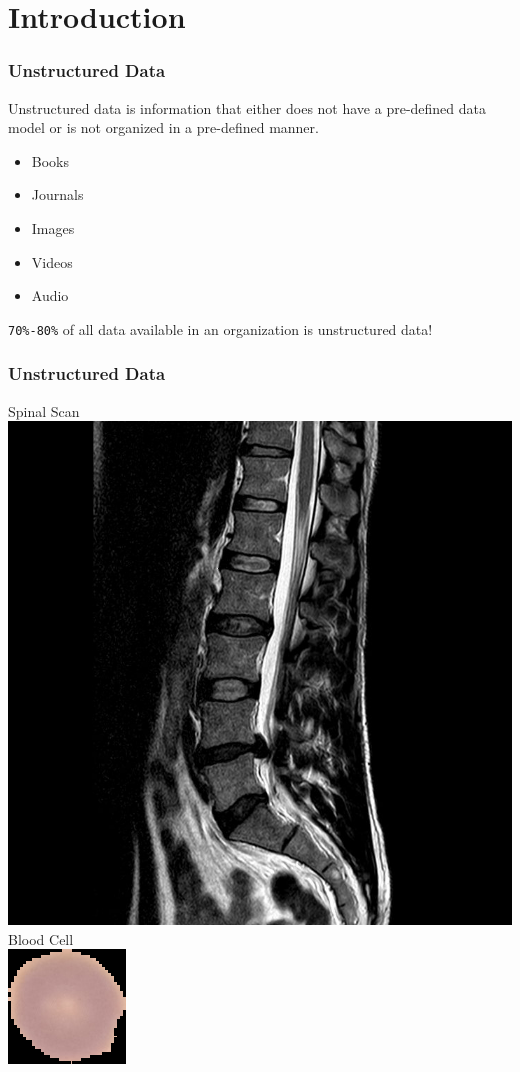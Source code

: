 \section{Introduction}

\begin{frame}[fragile]
  \frametitle{Unstructured Data}
  Unstructured data is information that either
  does not have a pre-defined data model or is not organized in a pre-defined
  manner.\\
  \begin{itemize}
  \item Books
  \item Journals
  \item Images
  \item Videos
  \item Audio
  \end{itemize}
  \verb|70%-80%| of all data available in an organization is
  unstructured data!
\end{frame}

\begin{frame}[fragile]
  \frametitle{Unstructured Data}
  Spinal Scan\\
  \includegraphics[scale=0.12]{img/back_scan}\\
  Blood Cell\\
  \includegraphics[scale=0.75]{img/img_4}
\end{frame}
